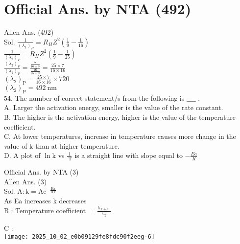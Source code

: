 \documentclass[10pt]{article}
\begin{document}
\section*{Official Ans. by NTA (492)}
Allen Ans. (492)\\
Sol. \(\frac{1}{\left(\lambda_{1}\right)_{P}}=R_{H} Z^{2}\left(\frac{1}{9}-\frac{1}{16}\right)\)\\
\(\frac{1}{\left(\lambda_{2}\right)_{P}}=R_{H} Z^{2}\left(\frac{1}{9}-\frac{1}{25}\right)\)\\
\(\frac{\left(\lambda_{2}\right)_{P}}{\left(\lambda_{1}\right)_{P}}=\frac{\frac{7}{16 \times 9}}{\frac{16}{25 \times 9}}=\frac{25 \times 7}{16 \times 16}\)\\
\(\left(\lambda_{2}\right)_{\mathrm{P}}=\frac{25 \times 7}{16 \times 16} \times 720\)\\
\(\left(\lambda_{2}\right)_{\mathrm{P}}=492 \mathrm{~nm}\)\\
54. The number of correct statement/s from the following is \(\_\_\_\_\) .\\
A. Larger the activation energy, smaller is the value of the rate constant.\\
B. The higher is the activation energy, higher is the value of the temperature coefficient.\\
C. At lower temperatures, increase in temperature causes more change in the value of k than at higher temperature.\\
D. A plot of \(\ln \mathrm{k}\) vs \(\frac{1}{\mathrm{~T}}\) is a straight line with slope equal to \(-\frac{E a}{R}\)

Official Ans. by NTA (3)\\
Allen Ans. (3)\\
Sol. \(\mathrm{A}: \mathrm{k}=\mathrm{A} \mathrm{e}^{-\frac{\mathrm{Ea}}{\mathrm{RT}}}\)\\
As Ea increases k decreases\\
B : Temperature coefficient \(=\frac{\mathrm{k}_{\mathrm{T}+10}}{\mathrm{k}_{\mathrm{T}}}\)

C :\\
\texttt{[image: 2025\_10\_02\_e0b09129fe8fdc90f2eeg-6]}
\end{document}
